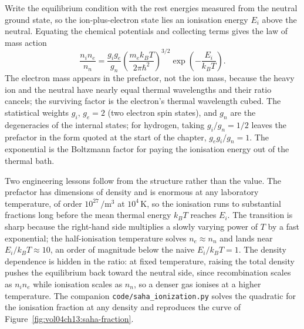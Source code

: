 Write the equilibrium condition with the rest energies measured from the
neutral ground state, so the ion-plus-electron state lies an ionisation
energy $E_{i}$ above the neutral. Equating the chemical potentials and
collecting terms gives the law of mass action
\[
\frac{n_{i}n_{e}}{n_{n}} = \frac{g_{i}g_{e}}{g_{n}}
\left(\frac{m_{e}k_{B}T}{2\pi\hbar^{2}}\right)^{3/2}
\exp\!\left(-\frac{E_{i}}{k_{B}T}\right).
\]
The electron mass appears in the prefactor, not the ion mass, because the
heavy ion and the neutral have nearly equal thermal wavelengths and their
ratio cancels; the surviving factor is the electron's thermal wavelength
cubed. The statistical weights $g_{i}$, $g_{e} = 2$ (two electron spin
states), and $g_{n}$ are the degeneracies of the internal states; for
hydrogen, taking $g_{i}/g_{n} = 1/2$ leaves the prefactor in the form quoted
at the start of the chapter, $g_{e}g_{i}/g_{n} = 1$. The exponential is the
Boltzmann factor for paying the ionisation energy out of the thermal bath.

Two engineering lessons follow from the structure rather than the value. The
prefactor has dimensions of density and is enormous at any laboratory
temperature, of order $10^{27}\,\si{\per\meter\cubed}$ at $10^{4}\,\si{
\kelvin}$, so the ionisation runs to substantial fractions long before the
mean thermal energy $k_{B}T$ reaches $E_{i}$. The transition is sharp
because the right-hand side multiplies a slowly varying power of $T$ by a
fast exponential; the half-ionisation temperature solves $n_{e} \approx
n_{n}$ and lands near $E_{i}/k_{B}T \approx 10$, an order of magnitude below
the naive $E_{i}/k_{B}T = 1$. The density dependence is hidden in the ratio:
at fixed temperature, raising the total density pushes the equilibrium back
toward the neutral side, since recombination scales as $n_{i}n_{e}$ while
ionisation scales as $n_{n}$, so a denser gas ionises at a higher
temperature. The companion \texttt{code/saha\_ionization.py} solves the
quadratic for the ionisation fraction at any density and reproduces the
curve of Figure~\ref{fig:vol04ch13:saha-fraction}.

